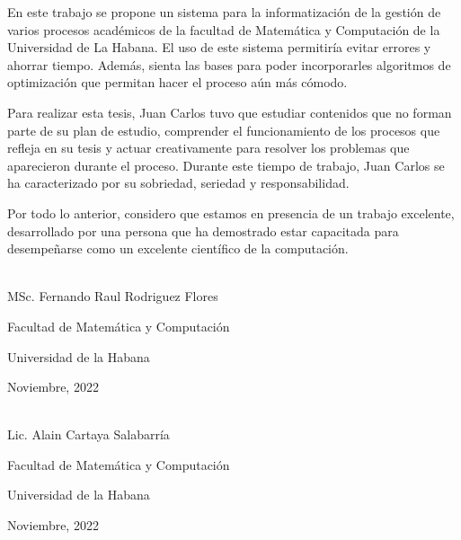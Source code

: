 \begin{opinion}
 En este trabajo se propone un sistema para la informatización de la gestión de varios procesos académicos de la facultad de Matemática y Computación de la Universidad de La Habana.  El uso de este sistema permitiría evitar errores y ahorrar tiempo.  Además, sienta las bases para poder incorporarles algoritmos de optimización que permitan hacer el proceso aún más cómodo.

 Para realizar esta tesis, Juan Carlos tuvo que estudiar contenidos que no forman parte de su plan de estudio, comprender el funcionamiento de los procesos que refleja en su tesis y actuar creativamente para resolver los problemas que aparecieron durante el proceso. Durante este tiempo de trabajo, Juan Carlos se ha caracterizado por su sobriedad, seriedad y responsabilidad.

 Por todo lo anterior, considero que estamos en presencia de un trabajo excelente, desarrollado por una persona que ha demostrado estar capacitada para desempeñarse como un excelente científico de la computación.

  \vspace{1cm}


  \begin{flushright}
    \underline{\hspace{6.5cm}}\\
    MSc. Fernando Raul Rodriguez Flores

    Facultad de Matemática y Computación
  
    Universidad de la Habana

    Noviembre, 2022
  \end{flushright}

  \begin{flushright}
   \underline{\hspace{6.5cm}}\\
   Lic. Alain Cartaya Salabarría

   Facultad de Matemática y Computación
  
   Universidad de la Habana

   Noviembre, 2022
 \end{flushright}
\end{opinion}